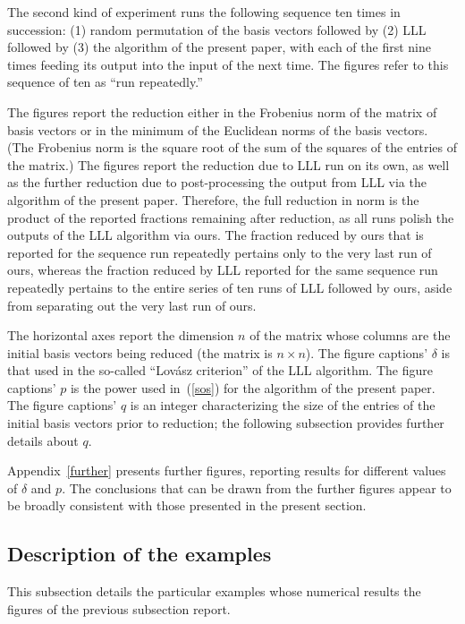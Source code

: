\documentclass{article}
\begin{document}
The second kind of experiment runs the following sequence ten times
in succession: (1) random permutation of the basis vectors
followed by (2) LLL followed by (3) the algorithm of the present paper,
with each of the first nine times feeding its output into the input
of the next time. The figures refer to this sequence of ten
as ``run repeatedly.''

The figures report the reduction either in the Frobenius norm
of the matrix of basis vectors or in the minimum of the Euclidean norms
of the basis vectors. (The Frobenius norm is the square root of the sum
of the squares of the entries of the matrix.)
The figures report the reduction due to LLL run on its own,
as well as the further reduction due to post-processing
the output from LLL via the algorithm of the present paper.
Therefore, the full reduction in norm is the product
of the reported fractions remaining after reduction,
as all runs polish the outputs of the LLL algorithm via ours.
The fraction reduced by ours that is reported for the sequence run repeatedly
pertains only to the very last run of ours,
whereas the fraction reduced by LLL reported
for the same sequence run repeatedly pertains to the entire series of ten runs
of LLL followed by ours, aside from separating out the very last run of ours.

The horizontal axes report the dimension $n$ of the matrix
whose columns are the initial basis vectors being reduced
(the matrix is $n \times n$).
The figure captions' $\delta$ is that used
in the so-called ``Lov\'asz criterion'' of the LLL algorithm.
The figure captions' $p$ is the power used in~(\ref{sos})
for the algorithm of the present paper.
The figure captions' $q$ is an integer characterizing the size of the entries
of the initial basis vectors prior to reduction;
the following subsection provides further details about $q$.

Appendix~\ref{further} presents further figures,
reporting results for different values of $\delta$ and $p$.
The conclusions that can be drawn from the further figures
appear to be broadly consistent with those presented in the present section.

\subsection{Description of the examples}
\label{examples}

This subsection details the particular examples whose numerical results
the figures of the previous subsection report.
\end{document}
